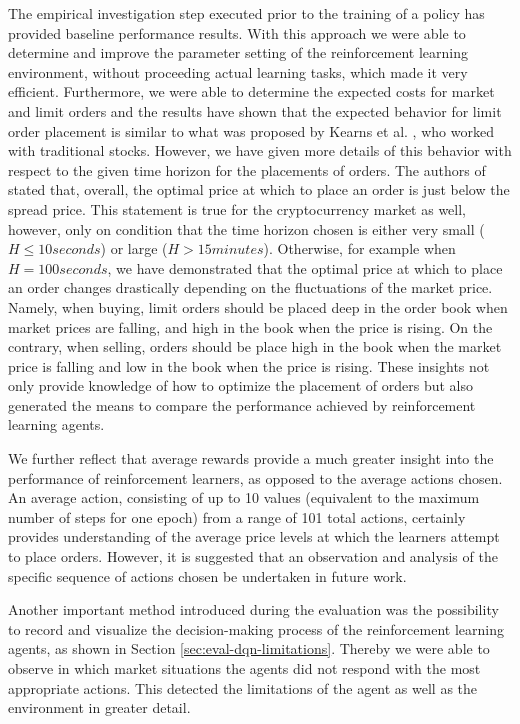     The empirical investigation step executed prior to the training of a policy has provided baseline performance results.
    With this approach we were able to determine and improve the parameter setting of the reinforcement learning environment, without proceeding actual learning tasks, which made it very efficient.
    Furthermore, we were able to determine the expected costs for market and limit orders and the results have shown that the expected behavior for limit order placement is similar to what was proposed by Kearns et al. \cite{nevmyvaka2005electronic}, who worked with traditional stocks.
    However, we have given more details of this behavior with respect to the given time horizon for the placements of orders.
    The authors of \cite{nevmyvaka2005electronic} stated that, overall, the optimal price at which to place an order is just below the spread price.
    This statement is true for the cryptocurrency market as well, however, only on condition that the time horizon chosen is either very small ($H\leq10 seconds$) or large ($H>15 minutes$).
    Otherwise, for example when $H=100 seconds$, we have demonstrated that the optimal price at which to place an order changes drastically depending on the fluctuations of the market price.
    Namely, when buying, limit orders should be placed deep in the order book when market prices are falling, and high in the book when the price is rising.
    On the contrary, when selling, orders should be place high in the book when the market price is falling and low in the book when the price is rising.
    These insights not only provide knowledge of how to optimize the placement of orders but also generated the means to compare the performance achieved by reinforcement learning agents.
    
    We further reflect that average rewards provide a much greater insight into the performance of reinforcement learners, as opposed to the average actions chosen.
    An average action, consisting of up to 10 values (equivalent to the maximum number of steps for one epoch) from a range of 101 total actions, certainly provides understanding of the average price levels at which the learners attempt to place orders.
    However, it is suggested that an observation and analysis of the specific sequence of actions chosen be undertaken in future work.
    
    Another important method introduced during the evaluation was the possibility to record and visualize the decision-making process of the reinforcement learning agents, as shown in Section \ref{sec:eval-dqn-limitations}.
    Thereby we were able to observe in which market situations the agents did not respond with the most appropriate actions.
    This detected the limitations of the agent as well as the environment in greater detail.
    

